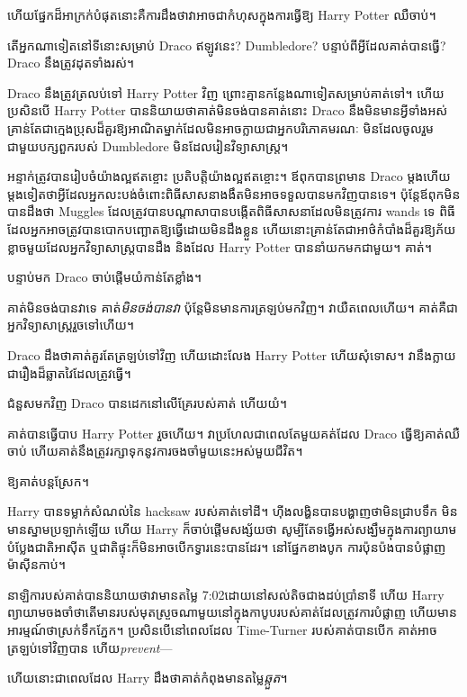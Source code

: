 {{{{{{ហើយផ្នែកដ៏អាក្រក់បំផុតនោះគឺការដឹងថាវាអាចជាកំហុសក្នុងការធ្វើឱ្យ Harry Potter ឈឺចាប់។

តើអ្នកណាទៀតនៅទីនោះសម្រាប់ Draco ឥឡូវនេះ? Dumbledore? បន្ទាប់​ពី​អ្វី​ដែល​គាត់​បាន​ធ្វើ? Draco នឹងត្រូវដុតទាំងរស់។

Draco នឹងត្រូវត្រលប់ទៅ Harry Potter វិញ ព្រោះគ្មានកន្លែងណាទៀតសម្រាប់គាត់ទៅ។ ហើយប្រសិនបើ Harry Potter បាននិយាយថាគាត់មិនចង់បានគាត់នោះ Draco នឹងមិនមានអ្វីទាំងអស់ គ្រាន់តែជាក្មេងប្រុសដ៏គួរឱ្យអាណិតម្នាក់ដែលមិនអាចក្លាយជាអ្នកបរិភោគមរណៈ មិនដែលចូលរួមជាមួយបក្សពួករបស់ Dumbledore មិនដែលរៀនវិទ្យាសាស្រ្ត។

អន្ទាក់ត្រូវបានរៀបចំយ៉ាងល្អឥតខ្ចោះ ប្រតិបត្តិយ៉ាងល្អឥតខ្ចោះ។ ឪពុកបានព្រមាន Draco ម្តងហើយម្តងទៀតថាអ្វីដែលអ្នកលះបង់ចំពោះពិធីសាសនាងងឹតមិនអាចទទួលបានមកវិញបានទេ។ ប៉ុន្តែឪពុកមិនបានដឹងថា Muggles ដែលត្រូវបានបណ្តាសាបានបង្កើតពិធីសាសនាដែលមិនត្រូវការ wands ទេ ពិធីដែលអ្នកអាចត្រូវបានបោកបញ្ឆោតឱ្យធ្វើដោយមិនដឹងខ្លួន ហើយនោះគ្រាន់តែជាអាថ៌កំបាំងដ៏គួរឱ្យភ័យខ្លាចមួយដែលអ្នកវិទ្យាសាស្ត្របានដឹង និងដែល Harry Potter បាននាំយកមកជាមួយ។ គាត់។

បន្ទាប់មក Draco ចាប់ផ្តើមយំកាន់តែខ្លាំង។

គាត់​មិន​ចង់​បាន​វា​ទេ គាត់​\emph{មិន​ចង់​បាន​វា} ប៉ុន្តែ​មិន​មាន​ការ​ត្រឡប់​មក​វិញ​។ វាយឺតពេលហើយ។ គាត់គឺជាអ្នកវិទ្យាសាស្ត្ររួចទៅហើយ។

Draco ដឹងថាគាត់គួរតែត្រឡប់ទៅវិញ ហើយដោះលែង Harry Potter ហើយសុំទោស។ វានឹងក្លាយជារឿងដ៏ឆ្លាតវៃដែលត្រូវធ្វើ។

ជំនួសមកវិញ Draco បានដេកនៅលើគ្រែរបស់គាត់ ហើយយំ។

គាត់បានធ្វើបាប Harry Potter រួចហើយ។ វា​ប្រហែល​ជា​ពេល​តែ​មួយ​គត់​ដែល Draco ធ្វើ​ឱ្យ​គាត់​ឈឺចាប់ ហើយ​គាត់​នឹង​ត្រូវ​រក្សា​ទុក​នូវ​ការ​ចងចាំ​មួយ​នេះ​អស់​មួយ​ជីវិត។

ឱ្យគាត់បន្តស្រែក។

\later

Harry បានទម្លាក់សំណល់នៃ hacksaw របស់គាត់ទៅដី។ ហ៊ីង​លង្ហិន​បាន​បង្ហាញ​ថា​មិន​ជ្រាប​ទឹក មិន​មាន​ស្នាម​ប្រឡាក់​ឡើយ ហើយ Harry ក៏​ចាប់​ផ្ដើម​សង្ស័យ​ថា សូម្បី​តែ​ទង្វើ​អស់សង្ឃឹម​ក្នុង​ការ​ព្យាយាម​បំប្លែង​ជាតិ​អាស៊ីត ឬ​ជាតិ​ផ្ទុះ​ក៏​មិន​អាច​បើក​ទ្វារ​នេះ​បាន​ដែរ។ នៅផ្នែកខាងបូក ការប៉ុនប៉ងបានបំផ្លាញម៉ាស៊ីនកាប់។

នាឡិការបស់គាត់បាននិយាយថាវាមានតម្លៃ 7:02\pm ដោយនៅសល់តិចជាងដប់ប្រាំនាទី ហើយ Harry ព្យាយាមចងចាំថាតើមានរបស់មុតស្រួចណាមួយនៅក្នុងកាបូបរបស់គាត់ដែលត្រូវការបំផ្លាញ ហើយមានអារម្មណ៍ថាស្រក់ទឹកភ្នែក។ ប្រសិនបើនៅពេលដែល Time-Turner របស់គាត់បានបើក គាត់អាចត្រឡប់ទៅវិញបាន ហើយ\emph{prevent}—

ហើយនោះជាពេលដែល Harry ដឹងថាគាត់កំពុងមានតម្លៃ\emph{ឆ្កួត}។

}}}}}}
